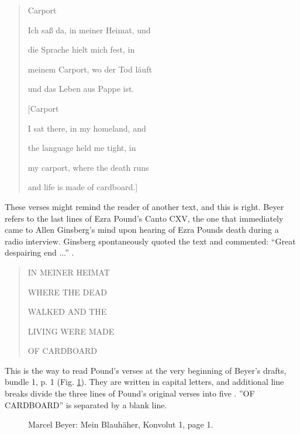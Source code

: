 \begin{paper}
\begin{quote}
Carport

Ich saß da, in meiner Heimat, und

die Sprache hielt mich fest, in

meinem Carport, wo der Tod läuft

und das Leben aus Pappe ist.

\vspace{1em}
 
{[}Carport

I sat there, in my homeland, and

the language held me tight, in

my carport, where the death runs

and life is made of cardboard.{]}

\begin{flushright}
    \parencite[173]{beyer_graphit_2014}
\end{flushright} 
\end{quote}

These verses might remind the reader of another text, and this is right.
Beyer refers to the last lines of Ezra Pound's Canto CXV, the one that
immediately came to Allen Ginsberg's mind upon hearing of Ezra Pounds
death during a radio interview. Ginsberg spontaneously quoted the text
and commented: ``Great despairing end ...'' \citep[185]{ginsberg_allen_1974}.

\begin{quote}
IN MEINER HEIMAT

WHERE THE DEAD

WALKED AND THE

LIVING WERE MADE

\vspace{1em}

OF CARDBOARD
\end{quote}

This is the way to read Pound's verses at the very beginning of Beyer's
drafts, bundle 1, p. 1 (Fig. \ref{fig:wix2}). They are written in capital letters, and
additional line breaks divide the three lines of Pound's original verses into five
\citep[1172]{pound_cantos_2012}. ''OF CARDBOARD'' is separated by a blank
line.


\begin{figure}[ph]
    \centering
    \caption{Marcel Beyer: Mein Blauhäher, Konvolut 1, page 1.}
    \label{fig:wix2}
\end{figure}


\end{paper}
